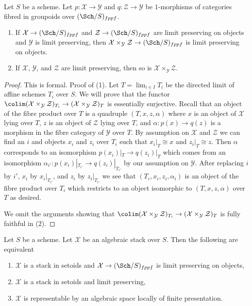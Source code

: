 \begin{lemma}
\label{lemma-fibre-product-limit-preserving}
Let $S$ be a scheme. Let $p : \mathcal{X} \to \mathcal{Y}$ and
$q : \mathcal{Z} \to \mathcal{Y}$ be $1$-morphisms of categories
fibred in groupoids over $(\Sch/S)_{fppf}$.
\begin{enumerate}
\item If $\mathcal{X} \to (\Sch/S)_{fppf}$ and
$\mathcal{Z} \to (\Sch/S)_{fppf}$ are limit preserving on objects and
$\mathcal{Y}$ is limit preserving, then
$\mathcal{X} \times_\mathcal{Y} \mathcal{Z} \to (\Sch/S)_{fppf}$ is
limit preserving on objects.
\item If $\mathcal{X}$, $\mathcal{Y}$,
and $\mathcal{Z}$ are limit preserving, then so
is $\mathcal{X} \times_\mathcal{Y} \mathcal{Z}$.
\end{enumerate}
\end{lemma}

\begin{proof}
This is formal. Proof of (1). Let $T = \lim_{i \in I} T_i$ be the directed
limit of affine schemes $T_i$ over $S$. We will prove that the functor
$\colim (\mathcal{X} \times_\mathcal{Y} \mathcal{Z})_{T_i} \to
(\mathcal{X} \times_\mathcal{Y} \mathcal{Z})_T$ is essentially surjective.
Recall that an object of the fibre product over $T$ is a quadruple
$(T, x, z, \alpha)$ where $x$ is an object of $\mathcal{X}$ lying over $T$,
$z$ is an object of $\mathcal{Z}$ lying over $T$, and
$\alpha : p(x) \to q(z)$ is a morphism in the fibre category of
$\mathcal{Y}$ over $T$. By assumption on $\mathcal{X}$ and $\mathcal{Z}$
we can find an $i$ and objects $x_i$ and $z_i$ over $T_i$ such that
$x_i|_T \cong x$ and $z_i|_T \cong z$. Then $\alpha$ corresponds to
an isomorphism $p(x_i)|_T \to q(z_i)|_T$ which comes from an isomorphism
$\alpha_{i'} : p(x_i)|_{T_{i'}} \to q(z_i)|_{T_{i'}}$ by our assumption on
$\mathcal{Y}$. After replacing $i$ by $i'$, $x_i$ by $x_i|_{T_{i'}}$, and
$z_i$ by $z_i|_{T_{i'}}$ we see that $(T_i, x_i, z_i, \alpha_i)$
is an object of the fibre product over $T_i$ which restricts to
an object isomorphic to $(T, x, z, \alpha)$ over $T$ as desired.

\medskip\noindent
We omit the arguments showing that $\colim (\mathcal{X} \times_\mathcal{Y} \mathcal{Z})_{T_i} \to
(\mathcal{X} \times_\mathcal{Y} \mathcal{Z})_T$ is fully faithful in (2).
\end{proof}

\begin{lemma}
\label{lemma-limit-preserving-algebraic-space}
Let $S$ be a scheme. Let $\mathcal{X}$ be an algebraic stack over $S$.
Then the following are equivalent
\begin{enumerate}
\item $\mathcal{X}$ is a stack in setoids and
$\mathcal{X} \to (\Sch/S)_{fppf}$ is limit preserving on objects,
\item $\mathcal{X}$ is a stack in setoids and limit preserving,
\item $\mathcal{X}$ is representable by an algebraic space
locally of finite presentation.
\end{enumerate}
\end{lemma}

